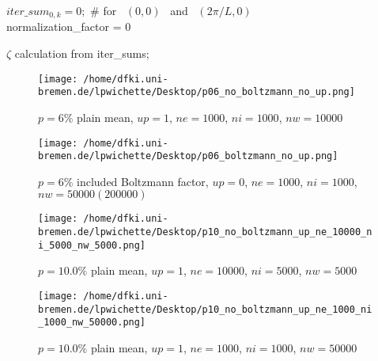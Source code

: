 \documentclass{article}
\begin{document}
\begin{algorithm}

$iter\_sum_{0, k} = 0;$ \qquad \# for~ $(0, 0)$ ~and~ $(2\pi/L, 0)$\\
normalization\_factor = 0\;

$\zeta$ calculation from iter\_sums;\

\end{algorithm}

\begin{figure}[h!]

  \begin{minipage}{0.5\linewidth}
    \centering
    \texttt{[image: /home/dfki.uni-bremen.de/lpwichette/Desktop/p06\_no\_boltzmann\_no\_up.png]}
    \caption{$p=6\%$ plain mean, $up=1$, $ne=1000$, $ni=1000$, $nw=10000$}
  \end{minipage}%
  \begin{minipage}{0.5\linewidth}
    \centering
    \texttt{[image: /home/dfki.uni-bremen.de/lpwichette/Desktop/p06\_boltzmann\_no\_up.png]}
    \caption{$p=6\%$ included Boltzmann factor, $up=0$, $ne=1000$, $ni=1000$, $nw=50000(200000)$}
  \end{minipage}

\end{figure}

\begin{figure}[h!]
  \begin{minipage}{0.5\textwidth}
    \centering
    \texttt{[image: /home/dfki.uni-bremen.de/lpwichette/Desktop/p10\_no\_boltzmann\_up\_ne\_10000\_ni\_5000\_nw\_5000.png]}
    \caption{$p=10.0\%$ plain mean, $up=1$, $ne=10000$, $ni=5000$, $nw=5000$}
  \end{minipage}%
  \begin{minipage}{0.5\textwidth}
    \centering
    \texttt{[image: /home/dfki.uni-bremen.de/lpwichette/Desktop/p10\_no\_boltzmann\_up\_ne\_1000\_ni\_1000\_nw\_50000.png]}
    \caption{$p=10.0\%$ plain mean, $up=1$, $ne=1000$, $ni=1000$, $nw=50000$}
  \end{minipage}
\end{figure}
\end{document}
